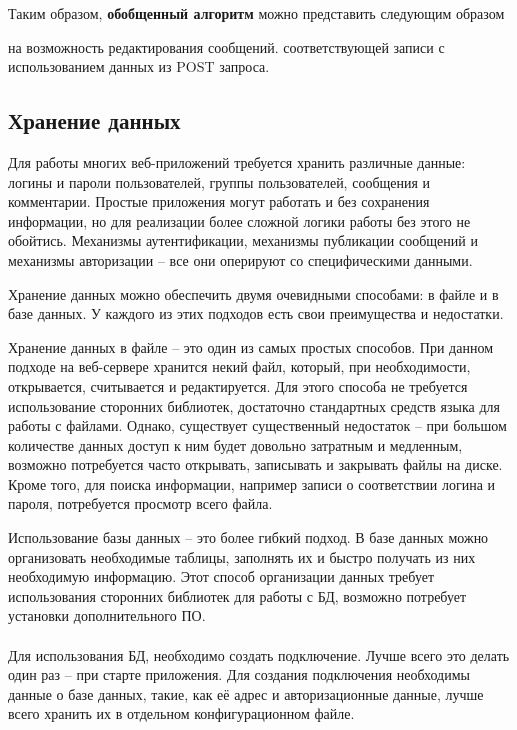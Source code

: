 \documentclass[a4paper]{article}
\begin{document}
Таким образом, \textbf{обобщенный алгоритм} можно представить следующим образом

\begin{enumerate}
 на возможность редактирования сообщений.
 соответствующей записи с использованием данных из POST запроса.
\end{enumerate}

\subsection{Хранение данных}

Для работы многих веб-приложений требуется хранить различные данные: логины и пароли пользователей, группы пользователей, сообщения и комментарии. Простые приложения могут работать и без сохранения информации, но для реализации более сложной логики работы без этого не обойтись. Механизмы аутентификации, механизмы публикации сообщений и механизмы авторизации -- все они оперируют со специфическими данными.

Хранение данных можно обеспечить двумя очевидными способами: в файле и в базе данных. У каждого из этих подходов есть свои преимущества и недостатки.

Хранение данных в файле -- это один из самых простых способов. При данном подходе на веб-сервере хранится некий файл, который, при необходимости, открывается, считывается и редактируется. Для этого способа не требуется использование сторонних библиотек, достаточно стандартных средств языка для работы с файлами. Однако, существует существенный недостаток -- при большом количестве данных доступ к ним будет довольно затратным и медленным, возможно потребуется часто открывать, записывать и закрывать файлы на диске. Кроме того, для поиска информации, например записи о соответствии логина и пароля, потребуется просмотр всего файла.

Использование базы данных -- это более гибкий подход. В базе данных можно организовать необходимые таблицы, заполнять их и быстро получать из них необходимую информацию. Этот способ организации данных требует использования сторонних библиотек для работы с БД, возможно потребует установки дополнительного ПО.\\\\

Для использования БД, необходимо создать подключение. Лучше всего это делать один раз -- при старте приложения. Для создания подключения необходимы данные о базе данных, такие, как её адрес и авторизационные данные, лучше всего хранить их в отдельном конфигурационном файле.
\end{document}
